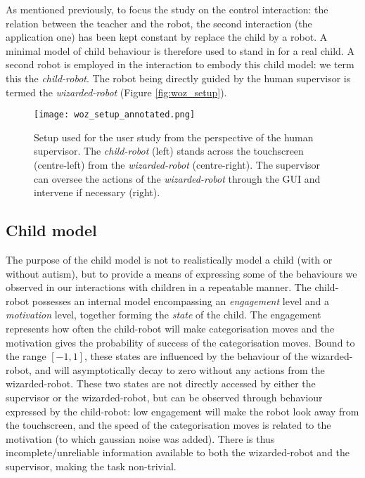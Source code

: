 As mentioned previously, to focus the study on the control interaction: the relation between the teacher and the robot, the second interaction (the application one) has been kept constant by replace the child by a robot. A minimal model of child behaviour is therefore used to stand in for a real child. A second robot is employed in the interaction to embody this child model: we term this the \textit{child-robot}. The robot being directly guided by the human supervisor is termed the \textit{wizarded-robot} (Figure \ref{fig:woz_setup}).

\begin{figure}[t!]
	\centering
	\texttt{[image: woz\_setup\_annotated.png]}
	\caption{Setup used for the user study from the perspective of the human supervisor. The \textit{child-robot} (left) stands across the touchscreen (centre-left) from the \textit{wizarded-robot} (centre-right). The supervisor can oversee the actions of the \textit{wizarded-robot} through the GUI and intervene if necessary (right).}
	\label{fig:setup}
\end{figure}
		
\subsection{Child model}

The purpose of the child model is not to realistically model a child (with or without autism), but to provide a means of expressing some of the behaviours we observed in our interactions with children in a repeatable manner.
The child-robot possesses an internal model encompassing an \emph{engagement} level and a \emph{motivation} level, together forming the \textit{state} of the child. 
The engagement represents how often the child-robot will make categorisation moves and the motivation gives the probability of success of the categorisation moves. Bound to the range $[-1, 1]$, these states are influenced by the behaviour of the wizarded-robot, and will asymptotically decay to zero without any actions from the wizarded-robot.
These two states are not directly accessed by either the supervisor or the wizarded-robot, but can be observed through behaviour expressed by the child-robot: low engagement will make the robot look away from the touchscreen, and the speed of the categorisation moves is related to the motivation (to which gaussian noise was added). There is thus incomplete/unreliable information available to both the wizarded-robot and the supervisor, making the task non-trivial.

